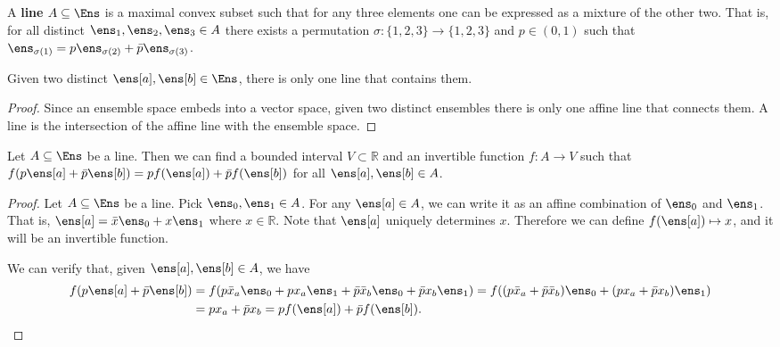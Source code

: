 \begin{mathSection}
\begin{defn}
	A \textbf{line} $A \subseteq \Ens$ is a maximal convex subset such that for any three elements one can be expressed as a mixture of the other two. That is, for all distinct $\ens_1, \ens_2, \ens_3 \in A$ there exists a permutation $\sigma : \{1,2,3\} \to \{1,2,3\}$ and $p \in (0,1)$ such that $\ens_{\sigma(1)} = p \ens_{\sigma(2)} + \bar{p} \ens_{\sigma(3)}$.
\end{defn}


\begin{prop}
	Given two distinct $\ens[a], \ens[b] \in \Ens$, there is only one line that contains them.
\end{prop}

\begin{proof}
	Since an ensemble space embeds into a vector space, given two distinct ensembles there is only one affine line that connects them. A line is the intersection of the affine line with the ensemble space.
\end{proof}

\begin{thrm}
	Let $A \subseteq \Ens$ be a line. Then we can find a bounded interval $V \subset \mathbb{R}$ and an invertible function $f : A \to V$ such that $f(p \ens[a] + \bar{p} \ens[b]) = p f(\ens[a]) + \bar{p} f(\ens[b])$ for all $\ens[a], \ens[b] \in A$.
\end{thrm}

\begin{proof}
	Let $A \subseteq \Ens$ be a line. Pick $\ens_0, \ens_1 \in A$. For any $\ens[a] \in A$, we can write it as an affine combination of $\ens_0$ and  $\ens_1$. That is, $\ens[a] = \bar{x}\ens_0 + x\ens_1$ where $x \in \mathbb{R}$. Note that $\ens[a]$ uniquely determines $x$. Therefore we can define $f(\ens[a]) \mapsto x$, and it will be an invertible function.
	
	We can verify that, given $\ens[a], \ens[b] \in A$, we have
	\begin{equation}
		\begin{aligned}
			f(p\ens[a] + \bar{p} \ens[b]) &= f(p\bar{x}_a \ens_0 + px_a \ens_1 + \bar{p}\bar{x}_b \ens_0 + \bar{p}x_b \ens_1) = f((p\bar{x}_a + \bar{p}\bar{x}_b) \ens_0 + (px_a + \bar{p}x_b) \ens_1) \\
			&= px_a + \bar{p}x_b = pf(\ens[a]) + \bar{p}f(\ens[b]).
		\end{aligned}
	\end{equation}
	

\end{proof}
\end{mathSection}
